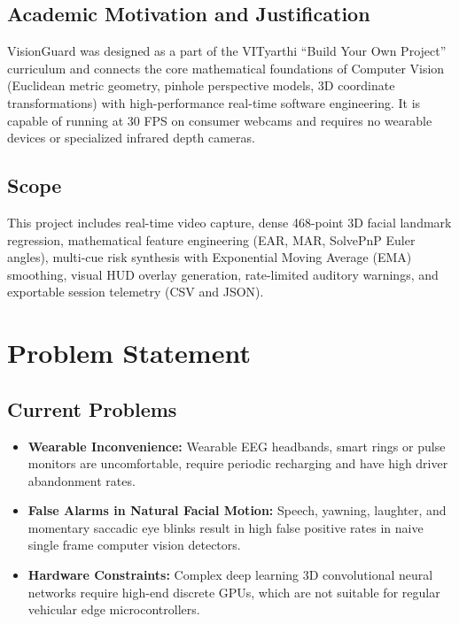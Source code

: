 \documentclass[11pt,a4paper]{article}
\begin{document}
\subsection{Academic Motivation and Justification}
VisionGuard was designed as a part of the VITyarthi ``Build Your Own Project'' curriculum and connects the core mathematical foundations of Computer Vision (Euclidean metric geometry, pinhole perspective models, 3D coordinate transformations) with high-performance real-time software engineering. It is capable of running at 30 FPS on consumer webcams and requires no wearable devices or specialized infrared depth cameras.

\subsection{Scope}
This project includes real-time video capture, dense 468-point 3D facial landmark regression, mathematical feature engineering (EAR, MAR, SolvePnP Euler angles), multi-cue risk synthesis with Exponential Moving Average (EMA) smoothing, visual HUD overlay generation, rate-limited auditory warnings, and exportable session telemetry (CSV and JSON).

\section{Problem Statement}
\subsection{Current Problems}
\begin{itemize}
    \item \textbf{Wearable Inconvenience:} Wearable EEG headbands, smart rings or pulse monitors are uncomfortable, require periodic recharging and have high driver abandonment rates.
    \item \textbf{False Alarms in Natural Facial Motion:} Speech, yawning, laughter, and momentary saccadic eye blinks result in high false positive rates in naive single frame computer vision detectors.
    \item \textbf{Hardware Constraints:} Complex deep learning 3D convolutional neural networks require high-end discrete GPUs, which are not suitable for regular vehicular edge microcontrollers.
\end{itemize}
\end{document}
